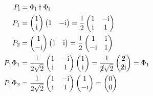 \subsection{}
\begin{align*}
    P_\mathrm i &= \Phi_\mathrm i\dagger\Phi_\mathrm i \\
    P_1 &= 
    \begin{pmatrix}
        1 \\ \mathrm i
    \end{pmatrix}\begin{pmatrix}
        1 & -\mathrm i
    \end{pmatrix} 
    = \frac 12
    \begin{pmatrix}
        1 &-\mathrm i \\
        \mathrm i &1
    \end{pmatrix} \\
     P_2 &= 
    \begin{pmatrix}
        1 \\ -\mathrm i
    \end{pmatrix}\begin{pmatrix}
        1 & \mathrm i
    \end{pmatrix} 
    = \frac 12
    \begin{pmatrix}
        1 & \mathrm i \\
        -\mathrm i & 1
    \end{pmatrix} \\
    P_1\Phi_1 &= \frac 1{2\sqrt 2}
    \begin{pmatrix}
        1 & -\mathrm i \\
        \mathrm i & 1
    \end{pmatrix} \begin{pmatrix}
        1 \\ \mathrm i 
    \end{pmatrix}
    = \frac 1{\cancel{2}\sqrt 2}\begin{pmatrix}
        \cancel{2} \\ \cancel{2} \mathrm i
    \end{pmatrix} 
    = \Phi_1 \\ 
    P_1\Phi_2 &= \frac 1{2\sqrt 2}
    \begin{pmatrix}
        1 & -\mathrm i \\
        \mathrm i & 1
    \end{pmatrix} \begin{pmatrix}
        1 \\ -\mathrm i 
    \end{pmatrix}
    = \begin{pmatrix}
        0 \\ 0

\end{pmatrix}
\end{align*}
